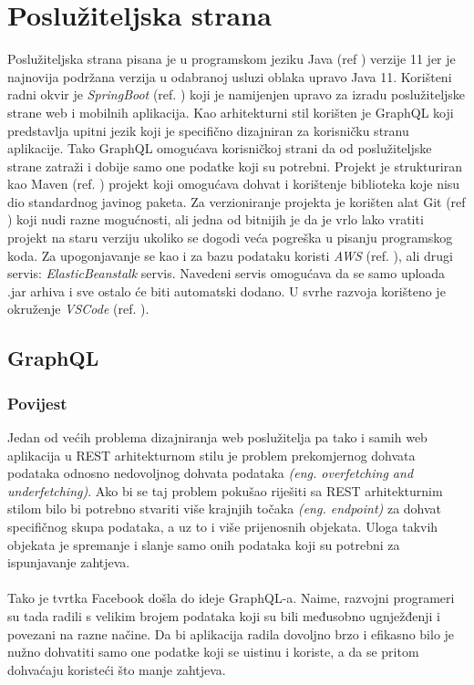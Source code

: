 \documentclass[times, utf8, zavrsni]{fer}
\begin{document}
\section{Poslužiteljska strana}
Poslužiteljska strana pisana je u programskom jeziku Java (ref \cite{ProgramiranjeUJavi}) verzije 11 jer je najnovija podržana verzija
u odabranoj usluzi oblaka upravo Java 11. Korišteni radni okvir je
\textit{SpringBoot} (ref. \cite{GraphQL}) koji je namijenjen upravo za izradu poslužiteljske strane web i mobilnih aplikacija.
Kao arhitekturni stil korišten je GraphQL koji predstavlja upitni jezik koji je specifično dizajniran za korisničku stranu aplikacije.
Tako GraphQL omogućava korisničkoj strani da od poslužiteljske strane zatraži i dobije samo one podatke koji su potrebni.
Projekt je strukturiran kao Maven (ref. \cite{maven}) projekt koji omogućava dohvat i korištenje biblioteka koje nisu
dio standardnog javinog paketa.
Za verzioniranje projekta je korišten alat Git (ref \cite{git}) koji nudi razne mogućnosti, ali jedna od
bitnijih je da je vrlo lako vratiti projekt na staru verziju
ukoliko se dogodi veća pogreška u pisanju programskog koda. Za upogonjavanje
se kao i za bazu podataku koristi \textit{AWS} (ref. \cite{AWS}), ali drugi servis: \textit{ElasticBeanstalk} servis.
Navedeni servis omogućava da se samo uploada .jar arhiva i sve ostalo će biti
automatski dodano.
U svrhe razvoja korišteno je okruženje \textit{VSCode} (ref. \cite{vsc}).

\subsection{GraphQL}

\subsubsection{Povijest}
Jedan od većih problema dizajniranja web poslužitelja pa tako i samih web aplikacija u REST
arhitekturnom stilu je problem prekomjernog dohvata podataka odnosno nedovoljnog dohvata podataka
\textit{(eng. overfetching and underfetching)}. Ako bi se taj problem pokušao riješiti sa REST
arhitekturnim stilom bilo bi potrebno stvariti više krajnjih točaka \textit{(eng. endpoint)} za dohvat specifičnog skupa podataka,
a uz to i više prijenosnih objekata.
Uloga takvih objekata je spremanje i slanje samo onih podataka koji su potrebni za ispunjavanje zahtjeva.
\\\\
Tako je tvrtka Facebook došla
do ideje GraphQL-a. Naime, razvojni programeri su tada radili s velikim brojem podataka koji su
bili međusobno ugnježđenji i povezani na razne načine. Da bi aplikacija radila dovoljno brzo
i efikasno bilo je nužno dohvatiti samo one podatke koji se uistinu i koriste, a da se pritom dohvaćaju koristeći
što manje zahtjeva.
\end{document}
